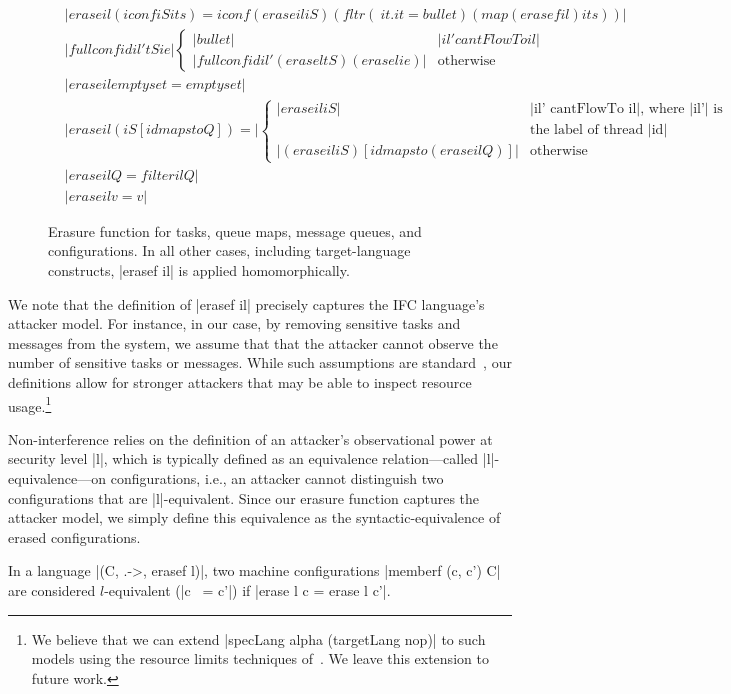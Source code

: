 \begin{figure} %
\begin{align*}
  &|erase il (iconf iS its) =
  iconf (erase il iS) (fltr (\ it . it = bullet) (map (erasef il) its))|\\
  &|fullconf id il' tS ie| \begin{cases}
    |bullet| & |il' cantFlowTo il| \\
    |fullconf id il' (erase l tS) (erase l ie)| & \text{otherwise}
  \end{cases} \\
  &|erase il emptyset = emptyset|\\
  &|erase il (iS [id mapsto Q]) =| \begin{cases}
    |erase il iS| & \text{|il' cantFlowTo il|, where |il'| is}\\
    & \text{the label of thread |id|} \\
    |(erase il iS) [id mapsto (erase il Q)]| & \text{otherwise}
  \end{cases} \\
  &|erase il Q = filter il Q|\\
  &|erase il v = v|
\end{align*}
\caption{ Erasure function for tasks, queue maps, message queues, and
configurations.  In all other cases, including target-language constructs,
|erasef il| is applied homomorphically.  \label{fig:erasure} }
\end{figure}

We note that the definition of |erasef il| precisely captures the IFC
language's attacker model. 
%
For instance, in our case, by removing sensitive tasks and messages from the
system, we assume that that the attacker cannot observe the number of sensitive
tasks or messages.
%
While such assumptions are standard~\tocite{}, our definitions allow for
stronger attackers that may be able to inspect resource usage.\footnote{
  We believe that we can extend |specLang alpha (targetLang nop)| to
  such models using the resource limits techniques of~\tocite{}.
  We leave this extension to future work.
}

Non-interference relies on the definition of an attacker's observational power at
security level |l|, which is typically defined as an equivalence
relation---called |l|-equivalence---on configurations, i.e., an attacker cannot
distinguish two configurations that are |l|-equivalent.
%
Since our erasure function captures the attacker model, we simply define this
equivalence as the syntactic-equivalence of erased configurations.
%
\begin{definition}[|l|-equivalence]
    In a language |(C, .->, erasef l)|, two machine configurations
    |memberf (c, c') C| are considered $l$-equivalent (|c ~= c'|)
    if |erase l c = erase l c'|.
\end{definition}
%

